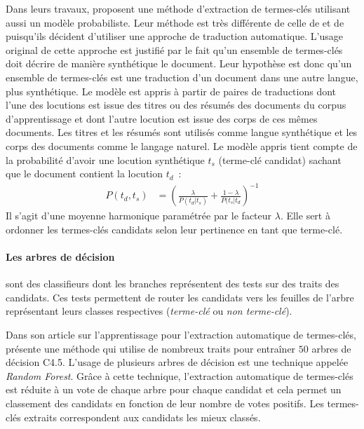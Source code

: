         Dans leurs travaux,  proposent une méthode
        d'extraction de termes-clés utilisant aussi un modèle probabiliste.
        Leur méthode est très différente de celle de  et
        de  puisqu'ils décident d'utiliser une
        approche de traduction automatique. L'usage original de cette approche
        est justifié par le fait qu'un ensemble de termes-clés doit décrire de
        manière synthétique le document. Leur hypothèse est donc qu'un
        ensemble de termes-clés est une traduction d'un document dans une
        autre langue, plus synthétique. Le modèle est appris à partir de
        paires de traductions dont l'une des locutions est issue des titres ou
        des résumés des documents du corpus d'apprentissage et dont l'autre
        locution est issue des corps de ces mêmes documents. Les titres et les
        résumés sont utilisés comme langue synthétique et les corps des
        documents comme le langage naturel. Le modèle appris tient compte de
        la probabilité d'avoir une locution synthétique $t_s$ (terme-clé
        candidat) sachant que le document contient la locution $t_d$~:
          \begin{align}
            P(t_d, t_s) &= \left(\frac{\lambda}{P(t_d | t_s)} + \frac{1 - \lambda}{P(t_s | t_d}\right)^{-1}
          \end{align}
        Il s'agit d'une moyenne harmonique paramétrée par le facteur
        $\lambda$. Elle sert à ordonner les termes-clés candidats selon leur
        pertinence en tant que terme-clé.

      \paragraph{Les arbres de décision}
        sont des classifieurs dont les branches représentent des tests sur des
        traits des candidats. Ces tests permettent de router les candidats
        vers les feuilles de l'arbre représentant leurs classes respectives
        (\textit{terme-clé} ou \textit{non terme-clé}).

        Dans son article sur l'apprentissage pour l'extraction automatique de
        termes-clés,  présente une méthode
        qui utilise de nombreux traits pour entraîner $50$ arbres de décision
        C4.5. L'usage de plusieurs arbres de décision est une technique
        appelée \textit{Random Forest}. Grâce à cette technique, l'extraction
        automatique de termes-clés est réduite à un vote de chaque arbre pour
        chaque candidat et cela permet un classement des candidats en fonction
        de leur nombre de votes positifs. Les termes-clés extraits
        correspondent aux candidats les mieux classés.

